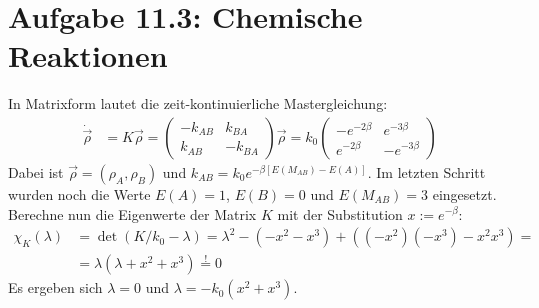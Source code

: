\documentclass[a4paper,12pt]{article}
\newcommand{\kla}{}
\begin{document}
\section*{Aufgabe 11.3: Chemische Reaktionen}
In Matrixform lautet die zeit-kontinuierliche Mastergleichung:
\begin{align*}
\dot{\vec{\rho}}&=K\vec{\rho}=\begin{pmatrix}
-k_{AB}&k_{BA} \\ k_{AB} &- k_{BA}
\end{pmatrix}\vec{\rho}=k_0\begin{pmatrix}
-e^{-2\beta}&e^{-3\beta} \\ e^{-2\beta}& -e^{-3\beta}
\end{pmatrix}
\end{align*}
Dabei ist $\vec{\rho}=(\rho_A,\rho_B)$ und $k_{AB}=k_0e^{-\beta [E(M_{AB})-E(A)]}$. Im letzten Schritt wurden noch die Werte $E(A)=1$, $E(B)=0$ und $E(M_{AB})=3$ eingesetzt. Berechne nun die Eigenwerte der Matrix $K$ mit der Substitution $x:=e^{-\beta}$:
\begin{align*}
\chi_K(\lambda)&=\det (K/k_0-\lambda)=\lambda^2 - (-x^2-x^3)+\kla\left( {(-x^2)(-x^3)-x^2x^3} \right)=\\
&=\lambda (\lambda +x^2+x^3)\overset{!}{=}0
\end{align*} 
Es ergeben sich $\lambda=0$ und $\lambda = -k_0(x^2+x^3)$.
\end{document}
